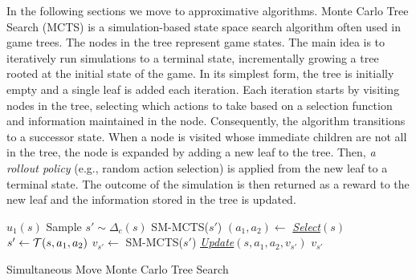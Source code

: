 In the following sections we move to approximative algorithms.
Monte Carlo Tree Search (MCTS) is a simulation-based state space search algorithm often used
in game trees. The nodes in the tree represent game states. The main idea is to iteratively run
simulations to a terminal state, incrementally growing a tree rooted at the initial state of the game. In
its simplest form, the tree is initially empty and a single leaf is added each iteration. Each iteration
starts by visiting nodes in the tree, selecting which actions to take based on a selection function and
information maintained in the node. Consequently, the algorithm transitions to a successor state. When a
node is visited whose immediate children are not all in the tree, the node is expanded by adding a
new leaf to the tree. Then, \emph{a rollout policy} (e.g., random action selection) is applied from the new
leaf to a terminal state. The outcome of the simulation is then returned as a reward to the new leaf
and the information stored in the tree is updated.

\begin{algorithm2e}[t]
\small
{}
 {
	\Return $u_1(s)$\;
}
 {
        Sample $s' \sim \Delta_c(s)$\;
	\Return SM-MCTS($s'$)\;
}
 {
	$(a_1, a_2) \leftarrow$ \emph{\underline{Select}}$(s)$\;\label{alg:smmcts:select}
	$s' \leftarrow \mathcal{T}(s,a_1,a_2)$\;
	$v_{s'} \leftarrow $ SM-MCTS($s'$)\;\label{alg:smmcts:reccall}
	\emph{\underline{Update}}$(s,a_1,a_2,v_{s'})$\;\label{alg:smmcts:up}
	\Return $v_{s'}$\;
}
\caption{Simultaneous Move Monte Carlo Tree Search}\label{alg:smmcts}
\end{algorithm2e}

